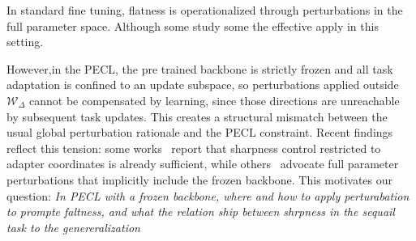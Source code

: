 \documentclass{article}
\theoremstyle{plain}
\theoremstyle{definition}
\theoremstyle{remark}
\begin{document}
In standard fine tuning, flatness is  operationalized through perturbations in the full parameter space\cite{}. Although some study some the effective apply in this setting.

However,in the PECL, the pre trained backbone is strictly frozen and all task adaptation is confined to an update subspace, so perturbations applied outside $\mathcal W_\Delta$ cannot be compensated by learning, since those directions are unreachable by subsequent task updates.
This creates a structural mismatch between the usual global perturbation rationale and the PECL constraint.
Recent findings reflect this tension: some works~\citep{NEURIPS2024_4eb2c0ad} report that sharpness control restricted to adapter coordinates is already sufficient, while others~\citep{li2025flatloralowrankadaptationflat} advocate full parameter perturbations that implicitly include the frozen backbone.
This motivates our question:
\emph{In PECL with a frozen backbone, where and how to apply perturabation to prompte  faltness, and what the relation ship between shrpness in the sequail task to the genereralization} 




\end{document}
